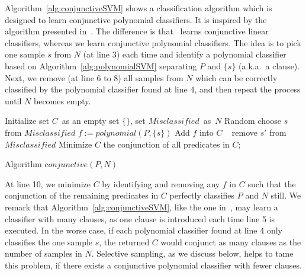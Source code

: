 Algorithm~\ref{alg:conjunctiveSVM} shows a classification algorithm which is designed to learn conjunctive polynomial classifiers.
It is inspired by the algorithm presented in~\cite{sharma2012interpolants}. 
The difference is that~\cite{sharma2012interpolants} learns conjunctive linear classifiers, whereas we learn conjunctive polynomial classifiers. 
The idea is to pick one sample $s$ from $N$ (at line 3) each time and identify a polynomial classifier based on Algorithm~\ref{alg:polynomialSVM} separating $P$ and $\{s\}$ (a.k.a.~a clause). 
Next, we remove (at line 6 to 8) all samples from $N$ which can be correctly classified by the polynomial classifier found at line 4, 
and then repeat the process until $N$ becomes empty.
\vspace{-0.2cm}
\begin{algorithm}[]
\SetAlgoVlined
\Indm
\Indp
    Initialize set $C$\ as an empty set $\{\}$, set $\mathit{Misclassified}$\ as\ $N$\;
     {
        Random choose $s$ from $\mathit{Misclassified}$\;
        $f := \mathit{polynomial}(P, \{s\})$\;
        Add $f$ into $C$\;
         {\
             {
                remove $s'$ from $\mathit{Misclassified}$\;
            }
        }
    }
    Minimize $C$\;
    \Return the conjunction of all predicates in $C$;
\caption{Algorithm $\mathit{conjunctive}(P, N)$}
\label{alg:conjunctiveSVM}
\end{algorithm}
\vspace{-0.2cm}
At line 10, we minimize $C$ by identifying and removing any $f$ in $C$ such that the conjunction of the remaining predicates in $C$ perfectly classifies $P$ and $N$ still. 
We remark that Algorithm~\ref{alg:conjunctiveSVM}, like the one in~\cite{sharma2012interpolants}, may learn a classifier with many clauses, as one clause is introduced each time line 5 is executed. 
In the worse case, if each polynomial classifier found at line 4 only classifies the one sample $s$, the returned $C$ would conjunct as many clauses as the number of samples in $N$. 
Selective sampling, as we discuss below, helps to tame this problem, if there exists a conjunctive polynomial classifier with fewer clauses.



